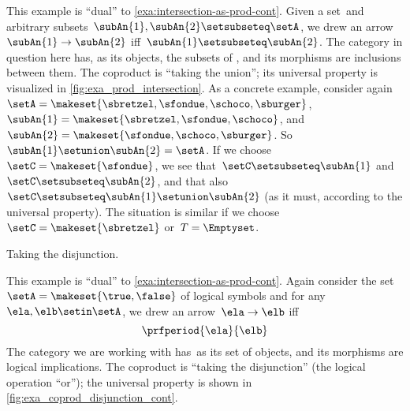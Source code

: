 \begin{example}
    \label{exa:union-as-coprod-cont}
    This example is ``dual'' to \cref{exa:intersection-as-prod-cont}.
    Given a set~\setA and arbitrary subsets~$\subAn{1}, \subAn{2} \setsubseteq \setA$, we drew an arrow~$\subAn{1} \to \subAn{2}$ iff~$\subAn{1} \setsubseteq \subAn{2}$.
    The category in question here has, as its objects, the subsets of \setA, and its morphisms are inclusions between them.
    The coproduct is ``taking the union''; its universal property is visualized in \cref{fig:exa_prod_intersection}.
    As a concrete example, consider again~$\setA = \makeset{ \sbretzel, \sfondue, \schoco, \sburger }$,~$\subAn{1} = \makeset{ \sbretzel, \sfondue, \schoco }$, and~$\subAn{2} = \makeset{\sfondue, \schoco, \sburger }$.
    So~$\subAn{1} \setunion \subAn{2} = \setA$.
    If we choose~$\setC = \makeset{ \sfondue }$, we see that~$\setC \setsubseteq \subAn{1}$ and~$\setC \setsubseteq \subAn{2}$, and that also~$\setC \setsubseteq \subAn{1} \setunion \subAn{2}$ (as it must, according to the universal property).
    The situation is similar if we choose~$\setC = \makeset{ \sbretzel }$ or~$T = \Emptyset$.
\end{example}

\begin{marginfigure}
    \centering
    \caption{Taking the disjunction.}
    \label{fig:exa_coprod_disjunction_cont}
\end{marginfigure}

\begin{example}
    \label{exa:disjunction-as-coprod-cont}
    This example is ``dual'' to \cref{exa:intersection-as-prod-cont}.
    Again consider the set~$\setA = \makeset{ \true, \false }$ of logical symbols and for any~$\ela, \elb  \setin \setA$, we drew an arrow~$\ela \to \elb$ iff
    \begin{equation}
        \prfperiod{\ela}{\elb}
    \end{equation}
    The category we are working with has~\setA as its set of objects, and its morphisms are logical implications.
    The coproduct is ``taking the disjunction'' (the logical operation ``or''); the universal property is shown in \cref{fig:exa_coprod_disjunction_cont}.
\end{example}

